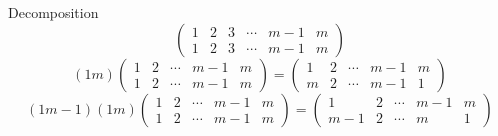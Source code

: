 \documentclass[11pt]{beamer}
\begin{document}
\begin{frame}{Decomposition}
	\begin{equation}
		\begin{pmatrix}
			1&2&3&\cdots& m-1&m\\
				1&2&3&\cdots& m-1&m
		\end{pmatrix}
	\end{equation}
	\begin{equation}
(1m)				\begin{pmatrix}
			1&2&\cdots& m-1&m\\
			1&2&\cdots& m-1&m
		\end{pmatrix}=	\begin{pmatrix}
		1&2&\cdots& m-1&m\\
		m&2&\cdots& m-1&1
		\end{pmatrix}
	\end{equation}
	\begin{equation}
(1m-1)	(1m)				\begin{pmatrix}
		1&2&\cdots& m-1&m\\
		1&2&\cdots& m-1&m
	\end{pmatrix}=	\begin{pmatrix}
		1&2&\cdots& m-1&m\\
		m-1&2&\cdots& m&1
	\end{pmatrix}
\end{equation}
\end{frame}
\end{document}
